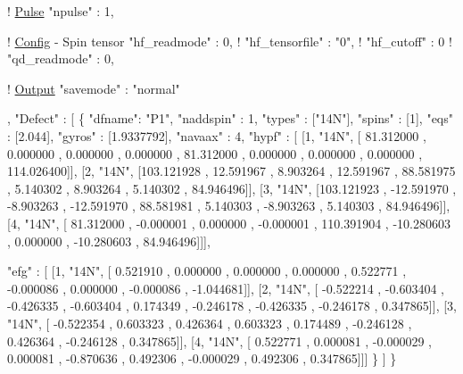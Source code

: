\begin{DoxyCodeInclude}
    ! \hyperlink{structPulse}{Pulse}
    \textcolor{stringliteral}{"npulse"}      : 1,

    ! \hyperlink{structConfig}{Config} - Spin tensor
    \textcolor{stringliteral}{"hf\_readmode"}   : 0, 
!  \textcolor{stringliteral}{"hf\_tensorfile"} : \textcolor{stringliteral}{"0"},
!  \textcolor{stringliteral}{"hf\_cutoff"}     : 0
!  \textcolor{stringliteral}{"qd\_readmode"}   : 0,

    ! \hyperlink{structOutput}{Output}
    \textcolor{stringliteral}{"savemode"}    : \textcolor{stringliteral}{"normal"}

,  \textcolor{stringliteral}{"Defect"}         : [
        \{   
            \textcolor{stringliteral}{"dfname"}: \textcolor{stringliteral}{"P1"},
            \textcolor{stringliteral}{"naddspin"} : 1,
            \textcolor{stringliteral}{"types"} : [\textcolor{stringliteral}{"14N"}],
            \textcolor{stringliteral}{"spins"} : [1],
            \textcolor{stringliteral}{"eqs"}   : [2.044],
            \textcolor{stringliteral}{"gyros"} : [1.9337792],
            \textcolor{stringliteral}{"navaax"} : 4,
            \textcolor{stringliteral}{"hypf"} : [ [1, \textcolor{stringliteral}{"14N"}, [ 81.312000 ,     0.000000 ,    0.000000 ,    0.000000 ,    81.312000 ,  
        0.000000 ,   0.000000 ,    0.000000 ,    114.026400]],
                       [2, \textcolor{stringliteral}{"14N"}, [103.121928 ,    12.591967 ,    8.903264 ,   12.591967 ,    88.581975 ,  
        5.140302 ,   8.903264 ,    5.140302 ,     84.946496]],
                       [3, \textcolor{stringliteral}{"14N"}, [103.121923 ,   -12.591970 ,   -8.903263 ,  -12.591970 ,    88.581981 ,  
        5.140303 ,  -8.903263 ,    5.140303 ,     84.946496]],
                       [4, \textcolor{stringliteral}{"14N"}, [ 81.312000 ,    -0.000001 ,    0.000000 ,   -0.000001 ,   110.391904 ,  
      -10.280603 ,   0.000000 ,  -10.280603 ,     84.946496]]],
        
            \textcolor{stringliteral}{"efg"} :  [ [1, \textcolor{stringliteral}{"14N"}, [  0.521910 ,     0.000000 ,    0.000000 ,    0.000000 ,     0.522771 ,  
       -0.000086 ,   0.000000 ,   -0.000086 ,     -1.044681]],
                       [2, \textcolor{stringliteral}{"14N"}, [ -0.522214 ,    -0.603404 ,   -0.426335 ,   -0.603404 ,     0.174349 ,  
       -0.246178 ,  -0.426335 ,   -0.246178 ,      0.347865]],
                       [3, \textcolor{stringliteral}{"14N"}, [ -0.522354 ,     0.603323 ,    0.426364 ,    0.603323 ,     0.174489 ,  
       -0.246128 ,   0.426364 ,   -0.246128 ,      0.347865]],
                       [4, \textcolor{stringliteral}{"14N"}, [  0.522771 ,     0.000081 ,   -0.000029 ,    0.000081 ,    -0.870636 ,  
        0.492306 ,  -0.000029 ,    0.492306 ,      0.347865]]]
        \}
                       ]
\}
\end{DoxyCodeInclude}


